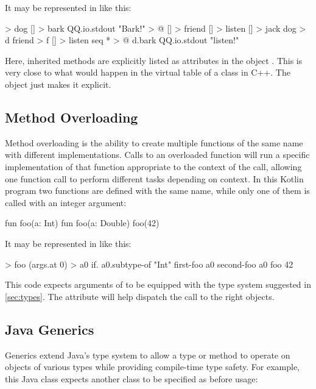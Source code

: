 \documentclass[sigplan,nonacm]{acmart}
\begin{document}
It may be represented in \eolang{} like this:

\begin{ffcode}
[] > dog
  [] > bark
    QQ.io.stdout "Bark!" > @
[] > friend
  [] > listen
[] > jack
  dog > d
  friend > f
  [] > listen
    seq * > @
      d.bark
      QQ.io.stdout "listen!"
\end{ffcode}

Here, inherited methods are explicitly listed as attributes in the object . This is very close to what would happen in the virtual table of a class  in C++. The \eolang{} object  just makes it explicit.

\subsection{Method Overloading}
\label{sec:overloading}

Method overloading is the ability to create multiple functions of the same name with different implementations. Calls to an overloaded function will run a specific implementation of that function appropriate to the context of the call, allowing one function call to perform different tasks depending on context. In this Kotlin program two functions are defined with the same name, while only one of them is called with an integer argument:

\begin{ffcode}
fun foo(a: Int) {}
fun foo(a: Double) {}
foo(42)
\end{ffcode}

It may be represented in \eolang{} like this:

\begin{ffcode}
[args...] > foo
  (args.at 0) > a0
  if.
    a0.subtype-of "Int"
    first-foo a0
    second-foo a0
foo 42
\end{ffcode}

This code expects arguments of  to be equipped with the type system suggested in \cref{sec:types}. The attribute  will help dispatch the call to the right objects.

\subsection{Java Generics}
\label{sec:generics}

Generics extend Java's type system to allow a type or method to operate on objects of various types while providing compile-time type safety. For example, this Java class expects another class to be specified as  before usage:
\end{document}
